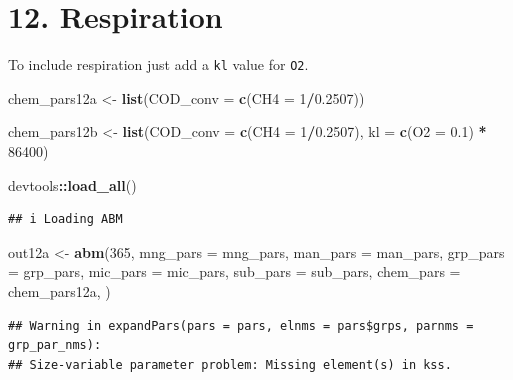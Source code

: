 \documentclass[
]{article}
\newenvironment{Shaded}{\begin{snugshade}}{\end{snugshade}}
\newcommand{\AttributeTok}[1]{\textcolor[rgb]{0.13,0.29,0.53}{#1}}
\newcommand{\DecValTok}[1]{\textcolor[rgb]{0.00,0.00,0.81}{#1}}
\newcommand{\FloatTok}[1]{\textcolor[rgb]{0.00,0.00,0.81}{#1}}
\newcommand{\FunctionTok}[1]{\textcolor[rgb]{0.13,0.29,0.53}{\textbf{#1}}}
\newcommand{\NormalTok}[1]{#1}
\newcommand{\OtherTok}[1]{\textcolor[rgb]{0.56,0.35,0.01}{#1}}
\newcommand{\SpecialCharTok}[1]{\textcolor[rgb]{0.81,0.36,0.00}{\textbf{#1}}}
\begin{document}
\hypertarget{respiration}{%
\section{12. Respiration}\label{respiration}}

To include respiration just add a \texttt{kl} value for \texttt{O2}.

\begin{Shaded}
\begin{Highlighting}[]
\NormalTok{chem\_pars12a }\OtherTok{\textless{}{-}} \FunctionTok{list}\NormalTok{(}\AttributeTok{COD\_conv =} \FunctionTok{c}\NormalTok{(}\AttributeTok{CH4 =} \DecValTok{1}\SpecialCharTok{/}\FloatTok{0.2507}\NormalTok{))}

\NormalTok{chem\_pars12b }\OtherTok{\textless{}{-}} \FunctionTok{list}\NormalTok{(}\AttributeTok{COD\_conv =} \FunctionTok{c}\NormalTok{(}\AttributeTok{CH4 =} \DecValTok{1}\SpecialCharTok{/}\FloatTok{0.2507}\NormalTok{),}
                     \AttributeTok{kl =} \FunctionTok{c}\NormalTok{(}\AttributeTok{O2 =} \FloatTok{0.1}\NormalTok{) }\SpecialCharTok{*} \DecValTok{86400}\NormalTok{)}
\end{Highlighting}
\end{Shaded}

\begin{Shaded}
\begin{Highlighting}[]
\NormalTok{devtools}\SpecialCharTok{::}\FunctionTok{load\_all}\NormalTok{()}
\end{Highlighting}
\end{Shaded}

\begin{verbatim}
## i Loading ABM
\end{verbatim}

\begin{Shaded}
\begin{Highlighting}[]
\NormalTok{out12a }\OtherTok{\textless{}{-}} \FunctionTok{abm}\NormalTok{(}\DecValTok{365}\NormalTok{,}
             \AttributeTok{mng\_pars =}\NormalTok{ mng\_pars,}
             \AttributeTok{man\_pars =}\NormalTok{ man\_pars,}
             \AttributeTok{grp\_pars =}\NormalTok{ grp\_pars,}
             \AttributeTok{mic\_pars =}\NormalTok{ mic\_pars,}
             \AttributeTok{sub\_pars =}\NormalTok{ sub\_pars,}
             \AttributeTok{chem\_pars =}\NormalTok{ chem\_pars12a,}
\NormalTok{)}
\end{Highlighting}
\end{Shaded}

\begin{verbatim}
## Warning in expandPars(pars = pars, elnms = pars$grps, parnms = grp_par_nms):
## Size-variable parameter problem: Missing element(s) in kss.
\end{verbatim}
\end{document}
